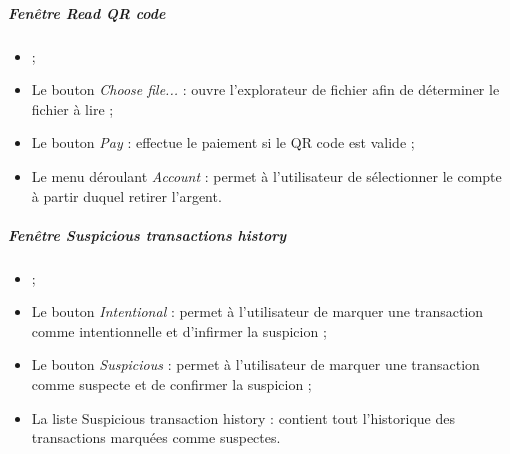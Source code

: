 \subparagraph{Fenêtre \emph{Read QR code}}
\begin{itemize}
\item {} ;
\item Le bouton \emph{Choose file...} : ouvre l'explorateur de fichier afin de déterminer le fichier à lire ;
\item Le bouton \emph{Pay} : effectue le paiement si le QR code est valide ;
\item Le menu déroulant \emph{Account} : permet à l'utilisateur de sélectionner le compte à partir duquel retirer l'argent.
\end{itemize}


\subparagraph{Fenêtre \emph{Suspicious transactions history}}
\begin{itemize}
\item {} ;
\item Le bouton \emph{Intentional} : permet à l'utilisateur de marquer une transaction comme intentionnelle et d'infirmer la suspicion ;
\item Le bouton  \emph{Suspicious} : permet à l'utilisateur de marquer une transaction comme suspecte et de confirmer la suspicion ;
\item La liste Suspicious transaction history : contient tout l'historique des transactions marquées comme suspectes.
\end{itemize}


